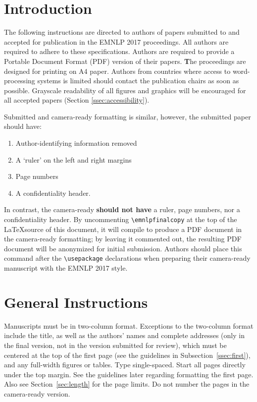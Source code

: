 
\section{Introduction}
The following instructions are directed to authors of papers submitted to
and accepted for publication in the EMNLP 2017 proceedings.  All authors
are required to adhere to these specifications. Authors are required to
provide a Portable Document Format (PDF) version of their papers. {\textbf The
proceedings are designed for printing on A4 paper}. Authors from countries
where access to word-processing systems is limited should contact the
publication chairs as soon as possible. Grayscale readability of all
figures and graphics will be encouraged for all accepted papers
(Section \ref{ssec:accessibility}).  

Submitted and camera-ready formatting is similar, however, the submitted
paper should have:
\begin{enumerate} 
\item Author-identifying information removed
\item A `ruler' on the left and right margins
\item Page numbers 
\item A confidentiality header.  
\end{enumerate}
In contrast, the camera-ready {\bf should  not have} a ruler, page numbers,
nor a confidentiality header.  By uncommenting {\small\verb|\emnlpfinalcopy|}
at the top of the \LaTeX source of this document, it will compile to
produce a PDF document in the camera-ready formatting; by leaving it
commented out, the resulting PDF document will be anonymized for initial
submission. Authors should place this command after the
{\small\verb|\usepackage|} declarations when preparing their camera-ready
manuscript with the EMNLP 2017 style.


\section{General Instructions}

Manuscripts must be in two-column format.  Exceptions to the two-column
format include the title, as well as the authors' names and complete
addresses (only in the final version, not in the version submitted for
review), which must be centered at the top of the first page (see the
guidelines in Subsection~\ref{ssec:first}), and any full-width figures or
tables.  Type single-spaced. Start all pages directly under the top margin.  
See the guidelines later regarding formatting the first page.  Also see 
Section~\ref{sec:length} for the page limits.
Do not number the pages in the camera-ready version. 

